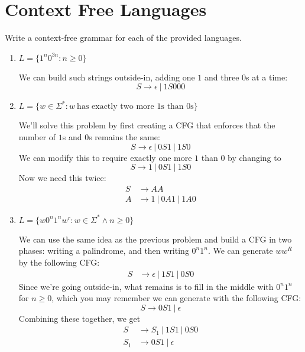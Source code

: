 \documentclass[fleqn]{article}
\begin{document}
\section{Context Free Languages}
Write a context-free grammar for each of the provided languages.
\begin{enumerate}
    \item $L = \{1^n 0^{3n} : n \geq 0\}$
    \begin{answer}
        We can build such strings outside-in, adding one $1$ and three $0$s at a time:
        \[
            \boxed{S \to \epsilon ~|~ 1S000}
        \]
    \end{answer}
    \item $L = \{w \in \Sigma^* : w~\text{has exactly two more }1\text{s than }0\text{s}\}$
    \begin{answer}
        We'll solve this problem by first creating a CFG that enforces that the number of $1$s and $0$s remains the same:
        \[
            S \to \epsilon~|~ 0S1~|~ 1S0
        \]
        We can modify this to require exactly one more $1$ than $0$ by changing to
        \[
            S \to 1 ~|~ 0S1 ~|~ 1S0
        \]
        Now we need this twice:
        \[
            \begin{aligned}
                S &\to AA \\
                A &\to 1 ~|~ 0A1 ~|~ 1A0
            \end{aligned}
        \]
    \end{answer}
    \item $L = \{w 0^n 1^n w^r : w \in \Sigma^* \wedge n \geq 0\}$
    \begin{answer}
        We can use the same idea as the previous problem and build a CFG in two phases: writing a palindrome, and then writing $0^n 1^n$. We can generate $w w^R$ by the following CFG:
        \[
            \begin{aligned}
                S &\to \epsilon ~|~ 1 S 1 ~|~ 0 S 0
            \end{aligned}
        \]
        Since we're going outside-in, what remains is to fill in the middle with $0^n 1^n$ for $n \geq 0$, which you may remember we can generate with the following CFG:
        \[
            S \to 0S1 ~|~ \epsilon 
        \]
        Combining these together, we get
        \[
            \boxed{
            \begin{aligned}
                S &\to S_1 ~|~ 1 S 1 ~|~ 0 S 0 \\
                S_1 &\to 0S1 ~|~ \epsilon
            \end{aligned}}
        \]
    \end{answer}
\end{enumerate}
\end{document}
